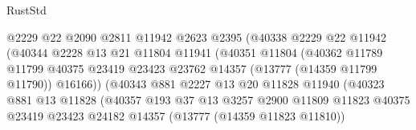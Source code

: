 \begin{lexlean}{RustStd}
\begin{coremodule}
                                    @2229
                                    @22
                                    @2090
                                    @2811
                                    @11942
                                    @2623
                                    @2395
                                    (@40338
                                      @2229
                                      @22
                                      @11942
                                      (@40344
                                        @2228
                                        @13
                                        @21
                                        @11804
                                        @11941
                                        (@40351
                                          @11804
                                          (@40362
                                            @11789
                                            @11799
                                            @40375
                                            @23419
                                            @23423
                                            @23762
                                            @14357
                                            (@13777 (@14359 @11799 @11790))
                                            @16166))
                                        (@40343
                                          @881
                                          @2227
                                          @13
                                          @20
                                          @11828
                                          @11940
                                          (@40323
                                            @881
                                            @13
                                            @11828
                                            (@40357
                                              @193
                                              @37
                                              @13
                                              @3257
                                              @2900
                                              @11809
                                              @11823
                                              @40375
                                              @23419
                                              @23423
                                              @24182
                                              @14357
                                              (@13777 (@14359 @11823 @11810))

\end{coremodule}
\end{lexlean}

